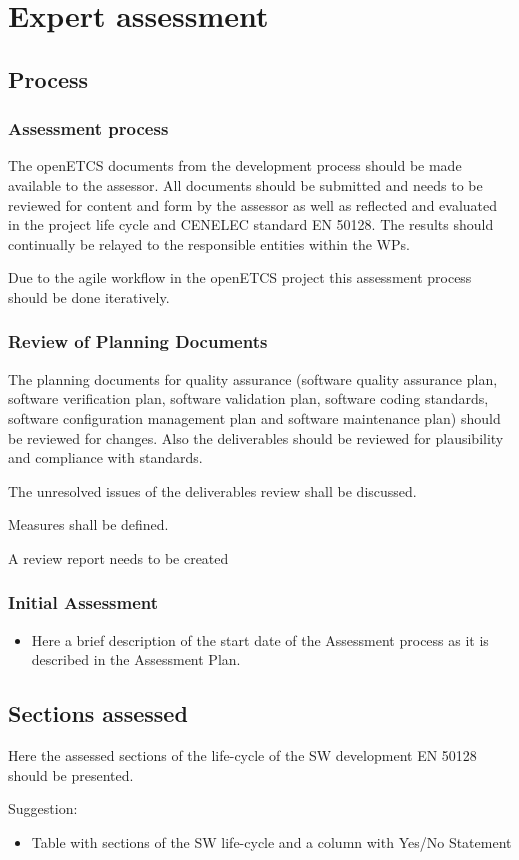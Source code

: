 \section{Expert assessment}
\subsection{Process }
\subsubsection{Assessment process}

\bigskip

{\textbullet} The openETCS documents from the development process should be made available to the assessor. All
documents should be submitted and needs to be reviewed for content and form by the assessor as well as reflected and
evaluated in the project life cycle and CENELEC standard EN 50128. The results should continually be relayed to the
responsible entities within the WPs.

{\textbullet} Due to the agile workflow in the openETCS project this assessment process should be done iteratively.


\bigskip

\subsubsection{Review of Planning Documents}
{\textbullet} The planning documents for quality assurance (software quality assurance plan, software verification plan,
software validation plan, software coding standards, software configuration management plan and software maintenance
plan) should be reviewed for changes. Also the deliverables should be reviewed for plausibility and compliance with
standards.

{\textbullet} The unresolved issues of the deliverables review shall be discussed.

{\textbullet} Measures shall be defined.

{\textbullet} A review report needs to be created


\bigskip


\bigskip

\subsubsection{Initial Assessment }
\liststyleLv
\begin{itemize}
\item Here a brief description of the start date of the Assessment process as it is described in the Assessment Plan. 
\end{itemize}
\subsection{Sections assessed}
{\textbullet} Here the assessed sections of the life-cycle of the SW development EN 50128 should be presented.

{\textbullet} Suggestion:

\begin{itemize}
\item Table with sections of the SW life-cycle and a column with Yes/No Statement 
\end{itemize}